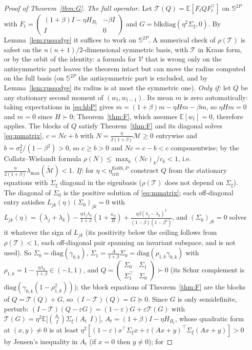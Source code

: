 \documentclass[11pt]{article}
\theoremstyle{remark}
\newcommand{\etacrit}{\eta_{\mathrm{crit}}}
\newcommand{\E}{\mathbb{E}}
\begin{document}
\begin{proof}[Proof of Theorem~\ref{thm:G}]
\emph{The full operator.} Let $\mathcal T(Q)=\E[F_tQF_t^\top]$ on $\mathbb S^{2P}$ with $F_t=\begin{pmatrix}(1+\beta)I-\eta H_{B_t}&-\beta I\\I&0\end{pmatrix}$ and $G=\mathrm{blkdiag}(\eta^2\Sigma_\xi,0)$. By Lemma~\ref{lem:russodye} it suffices to work on $\mathbb S^{2P}$. A numerical check of $\rho(\mathcal T)$ is safest on the $n(n+1)/2$-dimensional symmetric basis, with $\mathcal T$ in Kraus form, or by the orbit of the identity: a formula for $\mathcal V$ that is wrong only on the antisymmetric part leaves the theorem intact but can move the radius computed on the full basis (on $\mathbb S^{2P}$ the antisymmetric part is excluded, and by Lemma~\ref{lem:russodye} its radius is at most the symmetric one). \emph{Only if:} let $Q$ be any stationary second moment of $(w_t,w_{t-1})$. Its mean $m$ is zero automatically: taking expectations in \eqref{eq:hbP} gives $m=(1+\beta)m-\eta Hm-\beta m$, so $\eta Hm=0$ and $m=0$ since $H\succ0$; Theorem~\ref{thm:F}, which assumes $\E[w_t]=0$, therefore applies. The blocks of $Q$ satisfy Theorem~\ref{thm:F} and its diagonal solves \eqref{eq:mmatrix}, $c=Nc+b$ with $N=\frac{\eta}{2(1+\beta)}\mathcal M\ge0$ entrywise and $b=\sigma_\xi^2/(1-\beta^2)>0$, so $c\ge b>0$ and $Nc=c-b<c$ componentwise; by the Collatz--Wielandt formula $\rho(N)\le\max_k(Nc)_k/c_k<1$, i.e.\ $\frac{\eta}{2(1+\beta)}\lambda_{\max}(\widetilde{\mathcal M})<1$. \emph{If:} for $\eta<\etacrit^{\mathrm{EoSS},P}$ construct $Q$ from the stationary equations with $\Sigma_\xi$ diagonal in the eigenbasis ($\rho(\mathcal T)$ does not depend on $\Sigma_\xi$). The diagonal of $\Sigma_0$ is the positive solution of \eqref{eq:mmatrix}; each off-diagonal entry satisfies $L_{jk}(\eta)(\Sigma_0)_{jk}=0$ with $L_{jk}(\eta)=(\lambda_j+\lambda_k)-\frac{\eta\lambda_j\lambda_k}{1+\beta}(1+\frac{\kappa_\beta}{B})+\frac{\eta\beta(\lambda_j-\lambda_k)^2}{(1-\beta)(1-\beta^2)}$, and $(\Sigma_0)_{jk}=0$ solves it whatever the sign of $L_{jk}$ (its positivity below the ceiling follows from $\rho(\mathcal T)<1$, each off-diagonal pair spanning an invariant subspace, and is not used). So $\Sigma_0=\mathrm{diag}(\gamma_{0,k})$, $\Sigma_1=\frac{A}{1+\beta}\Sigma_0=\mathrm{diag}(\rho_{1,k}\gamma_{0,k})$ with $\rho_{1,k}=1-\frac{\eta\lambda_k}{1+\beta}\in(-1,1)$, and $Q=\begin{pmatrix}\Sigma_0&\Sigma_1\\\Sigma_1^\top&\Sigma_0\end{pmatrix}\succ0$ (its Schur complement is $\mathrm{diag}(\gamma_{0,k}(1-\rho_{1,k}^2))$); the block equations of Theorem~\ref{thm:F} are the blocks of $Q=\mathcal T(Q)+G$, so $(I-\mathcal T)(Q)=G\succeq0$. Since $G$ is only semidefinite, perturb: $(I-\mathcal T)(Q-\varepsilon G)=(1-\varepsilon)G+\varepsilon\mathcal T(G)$ with $\mathcal T(G)=\eta^2\E\big[\binom{A_t}{I}\Sigma_\xi(A_t\ \ I)\big]$, $A_t=(1+\beta)I-\eta H_{B_t}$, whose quadratic form at $(x,y)\ne0$ is at least $\eta^2[(1-\varepsilon)x^\top\Sigma_\xi x+\varepsilon(Ax+y)^\top\Sigma_\xi(Ax+y)]>0$ by Jensen's inequality in $A_t$ (if $x=0$ then $y\ne0$); for 
\end{proof}
\end{document}
